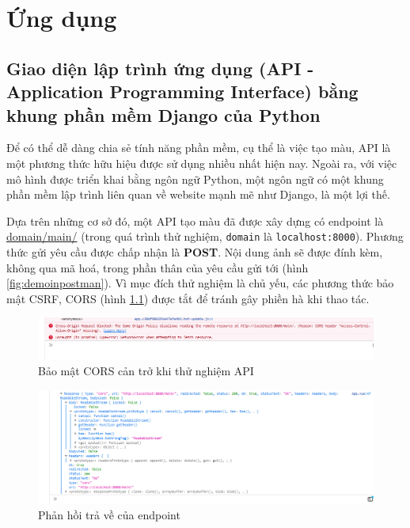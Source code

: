 \documentclass[a4paper, 12pt]{report}
\begin{document}
\chapter{Ứng dụng}

\section{Giao diện lập trình ứng dụng (API - Application Programming Interface) bằng khung phần mềm Django của Python}

Để có thể dễ dàng chia sẻ tính năng phần mềm, cụ thể là việc tạo màu, API là một phương thức hữu hiệu được sử dụng nhiều nhất hiện nay.
Ngoài ra, với việc mô hình được triển khai bằng ngôn ngữ Python, một ngôn ngữ có một khung phần mềm lập trình liên quan về website mạnh mẽ như Django, là một lợi thế.\vspace{5pt}

Dựa trên những cơ sở đó, một API tạo màu đã được xây dựng có endpoint là \href{domain/main/}{domain/main/} (trong quá trình thử nghiệm, \texttt{domain} là \texttt{localhost:8000}).
Phương thức gửi yêu cầu được chấp nhận là \textbf{POST}.
Nội dung ảnh sẽ được đính kèm, không qua mã hoá, trong phần thân của yêu cầu gửi tới (hình \ref{fig:demoinpostman}).
Vì mục đích thử nghiệm là chủ yếu, các phương thức bảo mật CSRF, CORS (hình \ref{fig:cors}) được tắt để tránh gây phiền hà khi thao tác.

\begin{figure}[!h]
\centering
\includegraphics[width=16cm]{images/cors.png}
\caption{Bảo mật CORS cản trở khi thử nghiệm API}
\label{fig:cors}
\end{figure}

\begin{figure}[!h]
\centering
\includegraphics[width=16cm]{images/readablestream.png}
\caption{Phản hồi trả về của endpoint}
\label{fig:readablestreamresponse}
\end{figure}
\end{document}
